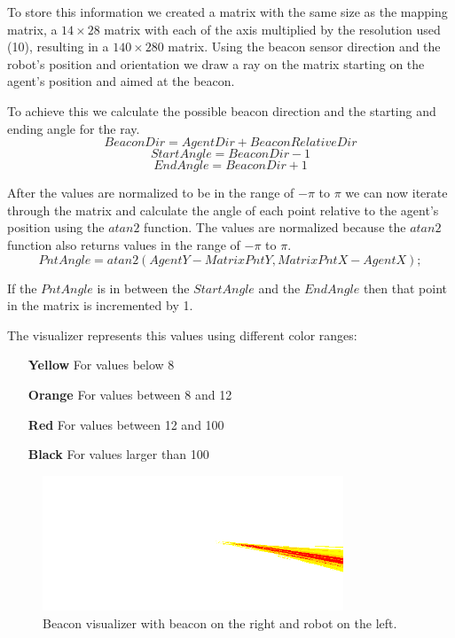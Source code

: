 \documentclass[oribibl]{llncs}
\begin{document}
To store this information we created a matrix with the same size as the
mapping matrix, a $14\times28$ matrix with each of the axis multiplied by the resolution
used (10), resulting in a $140\times280$ matrix. Using the beacon sensor direction and the
robot's position and orientation we draw a ray on the matrix starting on the agent's
position and aimed at the beacon.

To achieve this we calculate the possible beacon direction and the starting and ending
angle for the ray.
\begin{equation}
BeaconDir = AgentDir + BeaconRelativeDir
\end{equation}
\begin{equation}
StartAngle = BeaconDir - 1
\end{equation}
\begin{equation}
EndAngle = BeaconDir + 1
\end{equation}

After the values are normalized to be in the range of $-\pi$ to $\pi$ we can now
iterate through the matrix and calculate the angle of each
point relative to the agent's position using the $atan2$ function.
The values are normalized because the $atan2$ function also returns values in the range of
$-\pi$ to $\pi$.
\begin{equation}
PntAngle = atan2(AgentY - MatrixPntY, MatrixPntX - AgentX);
\end{equation}

If the $PntAngle$ is in between the $StartAngle$ and the $EndAngle$ then that point in the
matrix is incremented by 1.

The visualizer represents this values using different color ranges:
\begin{itemize}
  \item[\textbf{Yellow}] For values below 8
  \item[\textbf{Orange}] For values between 8 and 12
  \item[\textbf{Red}] For values between 12 and 100
  \item[\textbf{Black}]For values larger than 100
\end{itemize}

\begin{figure}
  \centering
  \includegraphics[width=0.8\textwidth]{beacon-1.png}
  \caption{Beacon visualizer with beacon on the right and robot on the left.}
  \label{fig:beacon1}
\end{figure}
\end{document}
